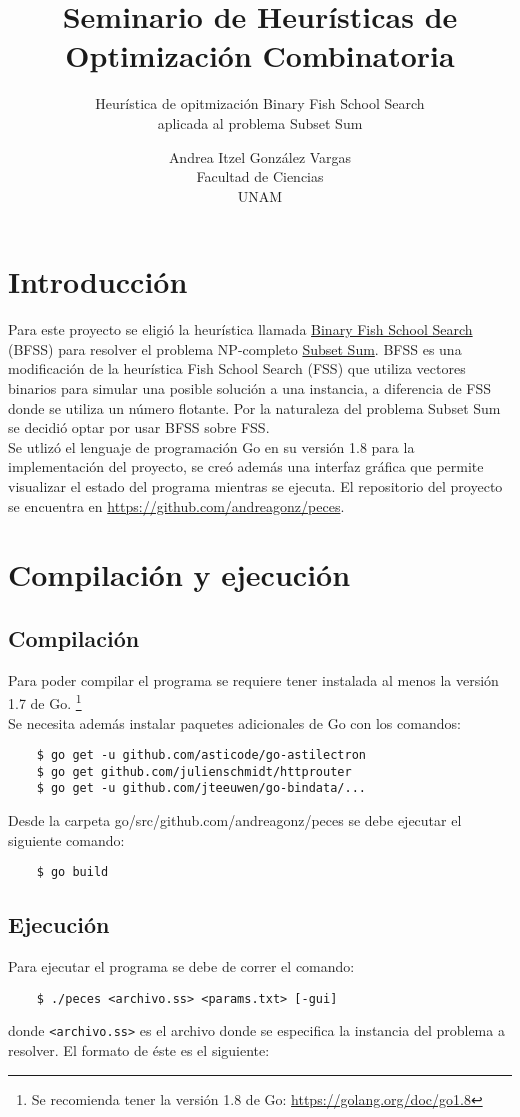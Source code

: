 \documentclass[12pt]{article}
\title{Seminario de Heurísticas de Optimización Combinatoria}
\author{Heurística de opitmización Binary Fish School Search \\ aplicada al problema Subset Sum}
\date{Andrea Itzel González Vargas \\ $\ $ \\ Facultad de Ciencias \\ UNAM}
\begin{document}
\maketitle
\tableofcontents
\newpage

\section{Introducción}
Para este proyecto se eligió la heurística llamada \hyperref[sec:bfss]{Binary Fish School Search} (BFSS) para resolver el problema NP-completo \hyperref[sec:ss]{Subset Sum}. BFSS es una modificación de la heurística Fish School Search (FSS) que utiliza vectores binarios para simular una posible solución a una instancia, a diferencia de FSS donde se utiliza un número flotante. Por la naturaleza del problema Subset Sum se decidió optar por usar BFSS sobre FSS. \\

Se utlizó el lenguaje de programación Go en su versión 1.8 para la implementación del proyecto, se creó además una interfaz gráfica que permite visualizar el estado del programa mientras se ejecuta. El repositorio del proyecto se encuentra en \url{https://github.com/andreagonz/peces}. 

\section{Compilación y ejecución}

\subsection{Compilación}
Para poder compilar el programa se requiere tener instalada al menos la versión 1.7 de Go. \footnote{Se recomienda tener la versión 1.8 de Go: \url{https://golang.org/doc/go1.8}} \\
Se necesita además instalar paquetes adicionales de Go con los comandos:
\begin{verbatim}
    $ go get -u github.com/asticode/go-astilectron
    $ go get github.com/julienschmidt/httprouter
    $ go get -u github.com/jteeuwen/go-bindata/...
\end{verbatim}
Desde la carpeta \textsf{go/src/github.com/andreagonz/peces} se debe ejecutar el siguiente comando:
\begin{verbatim}
    $ go build
\end{verbatim}

\subsection{Ejecución}
Para ejecutar el programa se debe de correr el comando:
\begin{verbatim}
    $ ./peces <archivo.ss> <params.txt> [-gui]
\end{verbatim}
donde \texttt{<archivo.ss>} es el archivo donde se especifica la instancia del problema a resolver. El formato de éste es el siguiente:  \\
\end{document}

